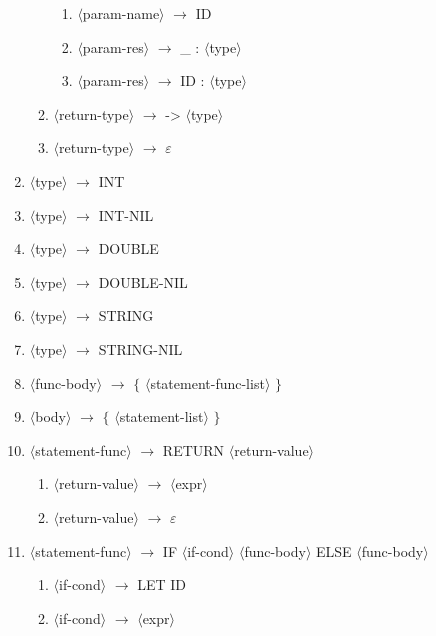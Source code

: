 \documentclass[a4paper]{article}
\newcommand{\red}[1]{{\color{red} #1}}
\begin{document}
\begin{enumerate}
\begin{enumerate}
\begin{enumerate}
            \item $\langle$param-name$\rangle$ $\rightarrow$ \red{ID}
            \item $\langle$param-res$\rangle$ $\rightarrow$ \red{\_ :} $\langle$type$\rangle$
            \item $\langle$param-res$\rangle$ $\rightarrow$ \red{ID :} $\langle$type$\rangle$
        \end{enumerate}
        \item $\langle$return-type$\rangle$ $\rightarrow$ \red{->} $\langle$type$\rangle$
        \item $\langle$return-type$\rangle$ $\rightarrow$ \red{$\varepsilon$}
    \end{enumerate}
    \item $\langle$type$\rangle$ $\rightarrow$ \red{INT}
    \item $\langle$type$\rangle$ $\rightarrow$ \red{INT-NIL}
    \item $\langle$type$\rangle$ $\rightarrow$ \red{DOUBLE}
    \item $\langle$type$\rangle$ $\rightarrow$ \red{DOUBLE-NIL}
    \item $\langle$type$\rangle$ $\rightarrow$ \red{STRING}
    \item $\langle$type$\rangle$ $\rightarrow$ \red{STRING-NIL}
    \item $\langle$func-body$\rangle$ $\rightarrow$ \red{$\{$} $\langle$statement-func-list$\rangle$ \red{$\}$}
    \item $\langle$body$\rangle$ $\rightarrow$ \red{$\{$} $\langle$statement-list$\rangle$ \red{$\}$}
    \item $\langle$statement-func$\rangle$ $\rightarrow$ \red{RETURN} $\langle$return-value$\rangle$
    \begin{enumerate}
        \item $\langle$return-value$\rangle$ $\rightarrow$ $\langle$expr$\rangle$
        \item $\langle$return-value$\rangle$ $\rightarrow$ \red{$\varepsilon$}
    \end{enumerate}
    \item $\langle$statement-func$\rangle$ $\rightarrow$ \red{IF} $\langle$if-cond$\rangle$ $\langle$func-body$\rangle$ \red{ELSE} $\langle$func-body$\rangle$
    \begin{enumerate}
        \item $\langle$if-cond$\rangle$ $\rightarrow$ \red{LET ID}
        \item $\langle$if-cond$\rangle$ $\rightarrow$ $\langle$expr$\rangle$

\end{enumerate}
\end{enumerate}
\end{document}
